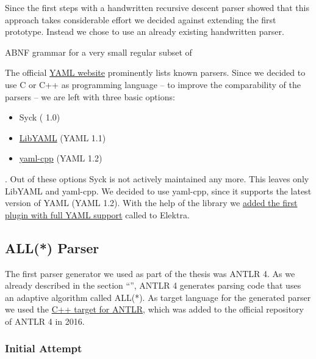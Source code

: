 Since the first steps with a handwritten recursive descent parser showed that this approach takes considerable effort we decided against extending the first prototype. Instead we chose to use an already existing handwritten  parser.

\begin{listing}
  \centering
  \begin{code-boxed}
    
  \end{code-boxed}
  \caption{ABNF grammar for a very small regular subset of }
  \label{cod:abnf_recurive_descent}
\end{listing}

The official \href{http://yaml.org}{YAML website} prominently lists known  parsers. Since we decided to use C or C++ as programming language – to improve the comparability of the parsers – we are left with three basic options:

\begin{itemize}
  \item Syck ( 1.0)
  \item \href{https://github.com/yaml/libyaml}{LibYAML} (YAML 1.1)
  \item \href{https://github.com/jbeder/yaml-cpp}{yaml-cpp} (YAML 1.2)
\end{itemize}

. Out of these options Syck is not actively maintained any more. This leaves only LibYAML and yaml-cpp. We decided to use yaml-cpp, since it supports the latest version of YAML (YAML 1.2). With the help of the library we \href{https://github.com/ElektraInitiative/libelektra/pull/1613}{added the first plugin with full YAML support} called \LinkYAMLCPP{} to Elektra.

\subsection{ALL(*) Parser}

The first parser generator we used as part of the thesis was \gls{ANTLR} 4. As we already described in the section “”, \gls{ANTLR} 4 generates parsing code that uses an adaptive  algorithm called ALL(*). As target language for the generated parser we used the \href{https://github.com/antlr/antlr4/pull/1210}{C++ target for ANTLR}, which was added to the official repository of \gls{ANTLR} 4 in 2016.

\subsubsection{Initial Attempt}


